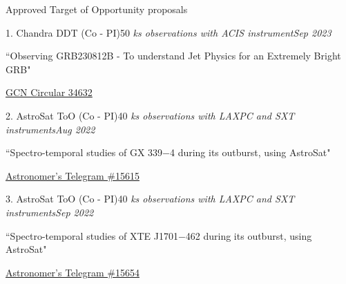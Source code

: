 \begin{section}{Approved Target of Opportunity proposals}
    \begin{subsectionnobullet}{1. Chandra DDT (Co - PI)}{50 \em{ks} observations with ACIS instrument}{\textit{Sep 2023}}{}
        \item {``Observing GRB230812B - To understand Jet Physics for an Extremely Bright GRB"}
        \item \href{https://gcn.nasa.gov/circulars/34632?query=pathak&startDate=&endDate=}{GCN Circular 34632}
    \end{subsectionnobullet}
            \vspace{-0.5em}
    \begin{subsectionnobullet}{2. AstroSat ToO (Co - PI)}{40 \em{ks} observations with LAXPC and SXT instruments}{\textit{Aug 2022}}{}
        \item {``Spectro-temporal studies of GX 339$-$4 during its outburst, using AstroSat"}
        \item  \href{https://www.astronomerstelegram.org/?read=15615}{Astronomer's Telegram \#15615}
    \end{subsectionnobullet}
\vspace{-0.5em}

        \begin{subsectionnobullet}{3. AstroSat ToO (Co - PI)}{40 \em{ks} observations with LAXPC and SXT instruments}{\textit{Sep 2022}}{}
        \item {``Spectro-temporal studies of XTE J1701$-$462 during its outburst, using AstroSat"}  
        \item \href{https://www.astronomerstelegram.org/?read=15654}{Astronomer's Telegram \#15654}  
    \end{subsectionnobullet}
\end{section}